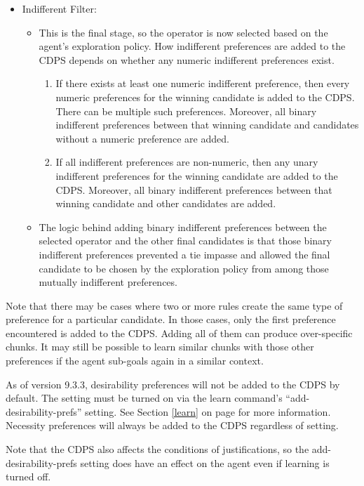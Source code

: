 \begin{itemize}
\item Indifferent Filter: 
\begin{itemize}
\item This is the final stage, so the operator is now selected based on the
agent's exploration policy.  How indifferent preferences are added to the CDPS
depends on whether any numeric indifferent preferences exist.
\begin{enumerate}
\item If there exists at least one numeric indifferent preference, then every
numeric preferences for the winning candidate is added to the CDPS.  There can
be multiple such preferences. Moreover, all binary indifferent preferences
between that winning candidate and candidates without a numeric preference are
added.
\item If all indifferent preferences are non-numeric, then any unary indifferent
preferences for the winning candidate are added to the CDPS.  Moreover, all
binary indifferent preferences between that winning candidate and other
candidates are added.
\end{enumerate}
\item The logic behind adding binary indifferent preferences between the
selected operator and the other final candidates is that those binary
indifferent preferences prevented a tie impasse and allowed the final
candidate to be chosen by the exploration policy from among those mutually
indifferent preferences.
\end{itemize}
\end{itemize}

Note that there may be cases where two or more rules create the same type of
preference for a particular candidate.  In those cases, only the first
preference encountered is added to the CDPS.  Adding all of them can produce
over-specific chunks.  It may still be
possible to learn similar chunks with those other preferences if the agent sub-goals
again in a similar context.

As of version 9.3.3, desirability preferences will not be added to the CDPS by
default.  The setting must be turned on via the learn command's
“add-desirability-prefs” setting.  See Section \ref{learn} on page \pageref{learn} for more
information.  Necessity preferences will always be added to the CDPS regardless
of setting.

Note that the CDPS also affects the conditions of justifications, so the
add-desirability-prefs setting does have an effect on the agent even if learning
is turned off.

